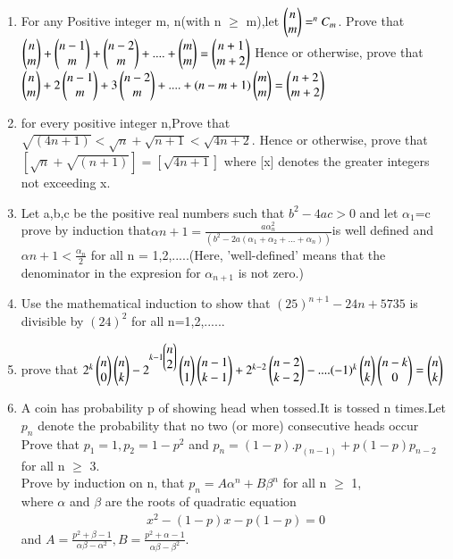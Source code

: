 \begin{enumerate}[label=\arabic*.,ref=\thesubsection.\theenumi]
\item For any Positive integer m, n(with n $\geq$ m),let $\begin{pmatrix}n\\m\end{pmatrix}= ^{n}C_m$. Prove that $\begin{pmatrix}n\\m\end{pmatrix}+\begin{pmatrix}n-1\\m\end{pmatrix}+\begin{pmatrix}n-2\\m\end{pmatrix}+....+\begin{pmatrix}m\\m\end{pmatrix}=\begin{pmatrix}n+1\\m+2\end{pmatrix}$ Hence or otherwise, prove that$\begin{pmatrix}n\\m\end{pmatrix}+2\begin{pmatrix}n-1\\m\end{pmatrix}+3\begin{pmatrix}n-2\\m\end{pmatrix}+....+(n-m+1)\begin{pmatrix}m\\m\end{pmatrix}=\begin{pmatrix}n+2\\m+2\end{pmatrix}$
\item for every positive integer n,Prove that\\
 $\sqrt{(4n+1)}<\sqrt{n}+\sqrt{n+1}<\sqrt{4n+2}.$ Hence or otherwise, prove that\\
  $[\sqrt{n}+\sqrt{(n+1)}]=[\sqrt{4n+1}]$ where [x] denotes the greater integers not exceeding x.
\item Let a,b,c be the positive real numbers such that $b^2-4ac>0$ and let $\alpha_1$=c prove by induction that$\alpha{n+1} = \frac{a\alpha^2_n}{(b^2-2a(\alpha_1+\alpha_2+...+\alpha_n))}$is well defined and 
$\alpha{n+1} < \frac{\alpha_n}{2}$ for all n = 1,2,.....(Here, 'well-defined' means that the denominator in the expresion for $\alpha_{n+1}$ is not zero.) 

\item Use the mathematical induction to show that $(25)^{n+1}-24n+5735$ is divisible by $(24)^2$ for all n=1,2,......
\item prove that $2^k\begin{pmatrix}n\\0\end{pmatrix}\begin{pmatrix}n\\k\end{pmatrix}-2^{k-1\begin{pmatrix}n\\2\end{pmatrix}}\begin{pmatrix}n\\1\end{pmatrix}\begin{pmatrix}n-1\\k-1\end{pmatrix}+2^{k-2}\begin{pmatrix}n-2\\k-2\end{pmatrix}-....(-1)^k \begin{pmatrix}n\\k\end{pmatrix}\begin{pmatrix}n-k\\0\end{pmatrix}=\begin{pmatrix}n\\k\end{pmatrix}$
\item A coin has probability p of showing head when tossed.It is tossed n times.Let $p_n$ denote the probability that no two (or more) consecutive heads occur Prove that $p_1=1,p_2=1-p^2$ and $p_n=(1-p).p_(n-1)+p(1-p)p_{n-2}$ for all n $\geq$ 3.\\
Prove by induction on n, that $p_n=A\alpha^n+B\beta^n$ for all n $\geq$ 1,\\
where $\alpha$ and $\beta$ are the roots of quadratic equation 
\begin{align}
x^2-(1-p)x-p(1-p)=0
\end{align} and $A=\frac{p^2+\beta-1}{\alpha\beta-\alpha^2},B=\frac{p^2+\alpha-1}{\alpha\beta-\beta^2}.$


\end{enumerate}
